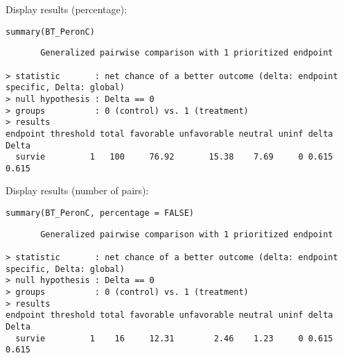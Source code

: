 \documentclass{article}
\begin{document}
Display results (percentage):
\lstset{language=r,label= ,caption= ,captionpos=b,numbers=none}
\begin{lstlisting}
summary(BT_PeronC)
\end{lstlisting}

\begin{verbatim}
       Generalized pairwise comparison with 1 prioritized endpoint

> statistic       : net chance of a better outcome (delta: endpoint specific, Delta: global) 
> null hypothesis : Delta == 0 
> groups          : 0 (control) vs. 1 (treatment) 
> results
endpoint threshold total favorable unfavorable neutral uninf delta Delta
  survie         1   100     76.92       15.38    7.69     0 0.615 0.615
\end{verbatim}

Display results (number of pairs):
\lstset{language=r,label= ,caption= ,captionpos=b,numbers=none}
\begin{lstlisting}
summary(BT_PeronC, percentage = FALSE)
\end{lstlisting}

\begin{verbatim}
       Generalized pairwise comparison with 1 prioritized endpoint

> statistic       : net chance of a better outcome (delta: endpoint specific, Delta: global) 
> null hypothesis : Delta == 0 
> groups          : 0 (control) vs. 1 (treatment) 
> results
endpoint threshold total favorable unfavorable neutral uninf delta Delta
  survie         1    16     12.31        2.46    1.23     0 0.615 0.615
\end{verbatim}
\end{document}
